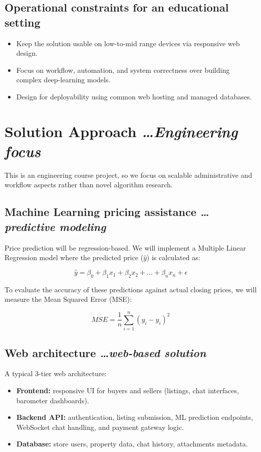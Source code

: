 \documentclass[11pt,a4paper]{article}
\newcommand{\BvrHint}[1]{%
  {\normalfont\normalsize\itshape\hfill #1}}
\begin{document}
\subsection{Operational constraints for an educational setting}
\begin{itemize}[leftmargin=0.7cm]
    \item Keep the solution usable on low-to-mid range devices via responsive web design.
    \item Focus on workflow, automation, and system correctness over building complex deep-learning models.
    \item Design for deployability using common web hosting and managed databases.
\end{itemize}

\section{Solution Approach %
\BvrHint{\ldots Engineering focus}}
This is an engineering course project, so we focus on scalable administrative and workflow aspects rather than novel algorithm research.

\subsection{Machine Learning pricing assistance %
\BvrHint{\ldots predictive modeling}}
Price prediction will be regression-based. We will implement a Multiple Linear Regression model where the predicted price ($\hat{y}$) is calculated as:

$$\hat{y} = \beta_0 + \beta_1 x_1 + \beta_2 x_2 + \dots + \beta_n x_n + \epsilon$$

To evaluate the accuracy of these predictions against actual closing prices, we will measure the Mean Squared Error (MSE):

$$MSE = \frac{1}{n} \sum_{i=1}^{n} (y_i - \hat{y}_i)^2$$

\subsection{Web architecture %
\BvrHint{\ldots web-based solution}}
A typical 3-tier web architecture:
\begin{itemize}[leftmargin=0.7cm]
    \item \textbf{Frontend:} responsive UI for buyers and sellers (listings, chat interfaces, barometer dashboards).
    \item \textbf{Backend API:} authentication, listing submission, ML prediction endpoints, WebSocket chat handling, and payment gateway logic.
    \item \textbf{Database:} store users, property data, chat history, attachments metadata.
\end{itemize}
\end{document}

